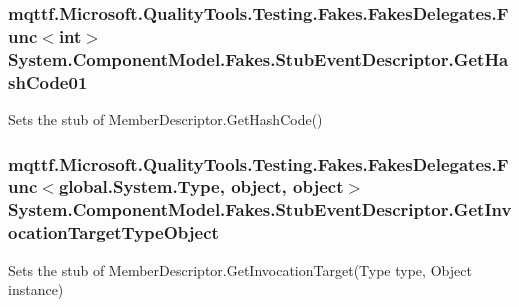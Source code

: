 \hypertarget{class_system_1_1_component_model_1_1_fakes_1_1_stub_event_descriptor_afd984bf9f990e3b8613be3240a2c93ba}{
\subsubsection[{Get\-Hash\-Code01}]{\setlength{\rightskip}{0pt plus 5cm}mqttf.\-Microsoft.\-Quality\-Tools.\-Testing.\-Fakes.\-Fakes\-Delegates.\-Func$<$int$>$ System.\-Component\-Model.\-Fakes.\-Stub\-Event\-Descriptor.\-Get\-Hash\-Code01}}\label{class_system_1_1_component_model_1_1_fakes_1_1_stub_event_descriptor_afd984bf9f990e3b8613be3240a2c93ba}


Sets the stub of Member\-Descriptor.\-Get\-Hash\-Code()

\hypertarget{class_system_1_1_component_model_1_1_fakes_1_1_stub_event_descriptor_a3fa1d813fffed3126565511fa48cba38}{
\subsubsection[{Get\-Invocation\-Target\-Type\-Object}]{\setlength{\rightskip}{0pt plus 5cm}mqttf.\-Microsoft.\-Quality\-Tools.\-Testing.\-Fakes.\-Fakes\-Delegates.\-Func$<$global.\-System.\-Type, object, object$>$ System.\-Component\-Model.\-Fakes.\-Stub\-Event\-Descriptor.\-Get\-Invocation\-Target\-Type\-Object}}\label{class_system_1_1_component_model_1_1_fakes_1_1_stub_event_descriptor_a3fa1d813fffed3126565511fa48cba38}


Sets the stub of Member\-Descriptor.\-Get\-Invocation\-Target(\-Type type, Object instance)

